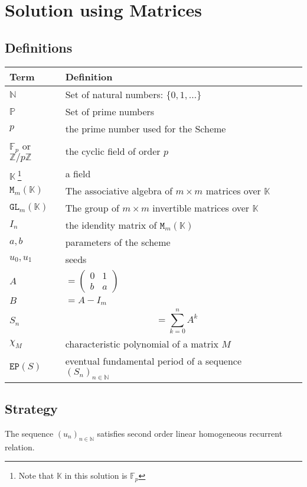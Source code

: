 \documentclass[]{article}
\begin{document}
\pagebreak
\section{Solution using Matrices}
\subsection{Definitions}
\begin{tabularx}{0.8\textwidth} { 
		| >{\raggedright\arraybackslash}X 
		| >{\centering\arraybackslash}X 
		| >{\raggedleft\arraybackslash}X | }
	\hline
	Term & Definition \\
	\hline
	$\mathbb{N}$ & Set of natural numbers: $\{0,1,\dots\}$  \\
	\hline
	
	$\mathbb{P}$ & Set of prime numbers  \\
	\hline
	$p$ & the prime number used for the Scheme  \\
	\hline
	$\mathbb{F}_p$ or $\mathbb{Z}/p\mathbb{Z}$ & the cyclic field of order $p$  \\
	\hline
	$\mathbb{K} \ $\footnote{Note that $\mathbb{K}$ in this solution is $\mathbb{F}_p$} & a field  \\
	\hline
	$\mathtt{M}_m(\mathbb{K})$ & The associative algebra of $m\times m$ matrices over $\mathbb{K}$  \\
	\hline
	$\mathtt{GL}_m(\mathbb{K})$ & The group of $m\times m$ invertible matrices over $\mathbb{K}$  \\
	\hline
		$I_n$ & the idendity matrix of 	$\mathtt{M}_m(\mathbb{K})$ \\
\hline
	$a,b$ & parameters of the scheme \\
\hline
	$u_0,u_1$ & seeds \\
\hline
	$A$ & $=\begin{pmatrix} 0&1 \\ b&a\end{pmatrix}$ \\
\hline
	$B$ & $=A-I_m$ \\
\hline
	$S_n$ & $$=\sum_{k=0}^n A^k$$ \\
\hline
	$\chi_M$ & characteristic polynomial of a matrix $M$  \\
\hline
	$\mathtt{EP}(S)$ & eventual fundamental period of a sequence $(S_n)_{n\in\mathbb{N}}$  \\
\hline
\end{tabularx}
\subsection{Strategy}
The sequence $(u_n)_{n\in\mathbb{N}}$ satisfies second order linear homogeneous recurrent relation.
\end{document}
